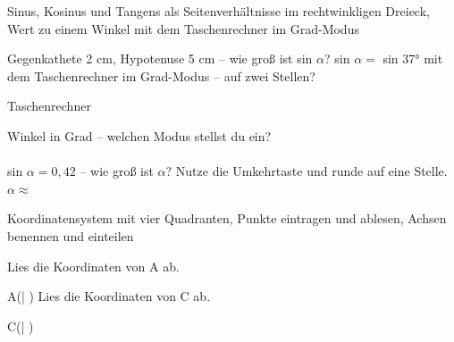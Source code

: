 \setcounter{aufgabe}{0}

\begin{aufgabe}{Sinus, Kosinus und Tangens als Seitenverhältnisse im rechtwinkligen Dreieck, Wert zu einem Winkel mit dem Taschenrechner im Grad-Modus}
\begin{teile}
\teil Gegenkathete 2 cm, Hypotenuse 5 cm – wie groß ist sin $\alpha$? sin $\alpha = $ \leerfeld
\teil sin 37° mit dem Taschenrechner im Grad-Modus – auf zwei Stellen? \leerfeld
\end{teile}
\end{aufgabe}

\begin{aufgabe}{Taschenrechner}
\begin{teile}
\teil Winkel in Grad – welchen Modus stellst du ein?\\ \\ 
\teil sin $\alpha = 0{,}42$ – wie groß ist $\alpha$? Nutze die Umkehrtaste und runde auf eine Stelle. $\alpha \approx$ \leerfeld[°]
\end{teile}
\end{aufgabe}

\begin{aufgabe}{Koordinatensystem mit vier Quadranten, Punkte eintragen und ablesen, Achsen benennen und einteilen}
\begin{teile}
\teil Lies die Koordinaten von A ab.

\begin{ksys}[xmin=-4,xmax=4,ymin=-4,ymax=4,ablesen]\end{ksys}
A(\leerfeld | \leerfeld)
\teil Lies die Koordinaten von C ab.

\begin{ksys}[xmin=-4,xmax=4,ymin=-4,ymax=4,xstep=0.5,ystep=0.5,ablesen]\end{ksys}
C(\leerfeld | \leerfeld)
\end{teile}
\end{aufgabe}

